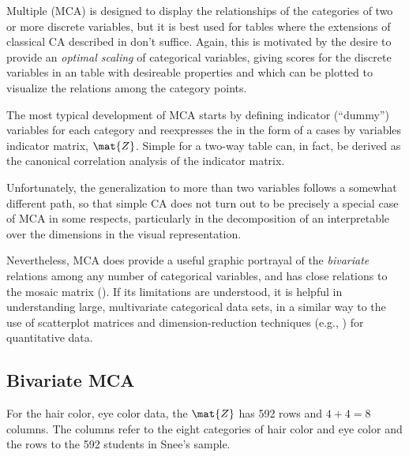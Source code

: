 \documentclass[11pt]{book}
\begin{document}
Multiple \ca (MCA) is designed to display the relationships of the categories
of two or more discrete variables, but it is best used for \mway tables
where the extensions of classical CA described in 
don't suffice.
Again, this is motivated by the desire to provide 
an \emph{optimal scaling} of categorical variables, giving scores for the 
discrete variables in an \nway table with desireable properties and which
can be plotted to visualize the relations among the category points.

The most typical development of MCA
starts by defining indicator (``dummy'') variables
for each category and reexpresses the \nway \ctab in the form
of a cases by variables indicator matrix, $\mat{Z}$.
Simple \ca for a two-way table can, in fact, be derived as the
canonical correlation analysis of the indicator matrix.

Unfortunately, the generalization to more than two variables follows
a somewhat different path, so that simple CA does not turn out to be
precisely a special case of MCA in some respects, particularly in the
decomposition of an interpretable \chisq over the dimensions in
the visual representation.

Nevertheless, MCA does provide a useful graphic portrayal of the
\emph{bivariate} relations among any number of categorical variables,
and has close relations to the mosaic matrix ().
If its limitations are understood, it is helpful in
understanding large, multivariate categorical data sets,
in a similar way to the use of scatterplot matrices
and dimension-reduction techniques 
(e.g., ) for quantitative data.



\subsection{Bivariate MCA}\label{sec:mca-bi}

For the hair color, eye color data, the  $\mat{Z}$
has 592 rows and $4+4=8$ columns.  The columns refer to the eight
categories of hair color and eye color and the rows to the 
592 students in Snee's \citeyear{Snee:74} sample.  
\end{document}
